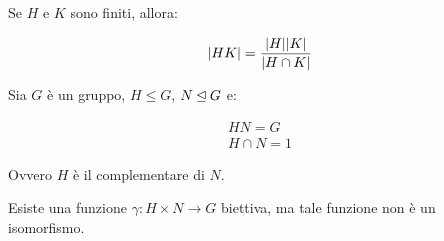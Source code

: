 \begin{teorema}
	\label{thr:ordine_prodotto_sottogruppi}
	Se $H$ e $K$ sono finiti, allora:

	\begin{equation}
		\lvert HK \rvert = \dfrac{\lvert H \rvert\lvert K \rvert}{\lvert H \cap K \rvert}
	\end{equation}
\end{teorema}

\begin{esercizio}
	Sia $G$ è un gruppo, $H \le G$, $N \unlhd G$ e:
	
	\begin{gather}
		HN = G \\
		H \cap N = 1
	\end{gather}

	Ovvero $H$ è il complementare di $N$.
	
	Esiste una funzione $\gamma: H \times N \longrightarrow G$ biettiva, ma tale funzione non è un isomorfismo.
\end{esercizio}
